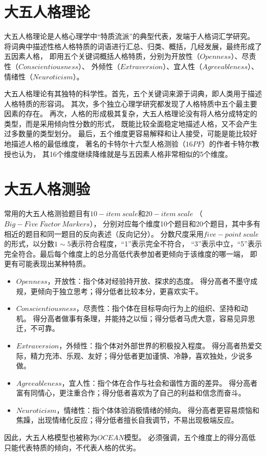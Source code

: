 \documentclass[UTF8]{ctexart}
\begin{document}
\section{大五人格理论}
大五人格理论是人格心理学中“特质流派”的典型代表，发端于人格词汇学研究。
将词典中描述性格人格特质的词语进行汇总、归类、概括，几经发展，最终形成了五因素人格，
即用五个关键词概括人格特质，分别为开放性（$Openness$）、尽责性（$Conscientiousness$）、
外倾性（$Extraversion$）、宜人性（$Agreeableness$）、情绪性（$Neuroticism$）。\par
大五人格理论有其独特的科学性。首先，五个关键词来源于词典，即人类用于描述人格特质的形容词。
其次，多个独立心理学研究都发现了人格特质中五个最主要因素的存在。
再次，人格的形成极其复杂，大五人格理论没有将人格分成特定的类型，而是采用倾向性分数的形式，
既能比较全面稳定地描述人格，又不会产生过多数量的类型划分。
最后，五个维度更容易解释和让人接受，可能是能比较好地描述人格的最低维度，
著名的卡特尔十六型人格测验（$16PF$）的作者卡特尔教授也认为，
其16个维度继续降维就是与五因素人格非常相似的5个维度。
\section{大五人格测验}
常用的大五人格测验题目有$10-item\ scale$和$20-item\ scale$
（\href{https://ipip.ori.org/newBigFive5broadKey.htm}{$Big-Five\ Factor\ Markers$}），
分别对应每个维度10个题目和20个题目，其中多有相近的题目和同一题目的反向表述（反向记分）。
分数尺度采用$five-point\ scale$的形式，以分数$1\sim5$表示符合程度，“1”表示完全不符合，
“3”表示中立，“5”表示完全符合。最后每个维度上的总分高低代表参加者更倾向于该维度的哪一端，
即更有可能表现出某种特质。
\begin{itemize}
  \item $Openness$，开放性：指个体对经验持开放、探求的态度。
        得分高者不墨守成规，更倾向于独立思考；得分低者比较本分，更喜欢实干。
  \item $Conscientiousness$，尽责性：指个体在目标导向行为上的组织、坚持和动机。
        得分高者做事有条理，并能持之以恒；得分低者马虎大意，容易见异思迁，不可靠。
  \item $Extraversion$，外倾性：指个体对外部世界的积极投入程度。
        得分高者热爱交际，精力充沛、乐观、友好；得分低者更加谨慎、冷静，喜欢独处，少说多做。
  \item $Agreeableness$，宜人性：指个体在合作与社会和谐性方面的差异。
        得分高者富有同情心，更注重合作；得分低者喜欢为了自己的利益和信念而奋斗。
  \item $Neuroticism$，情绪性：指个体体验消极情绪的倾向。
        得分高者更容易烦恼和焦躁，出现情绪化反应；得分低者擅长自我调节，不易出现极端反应。
\end{itemize}
\par
因此，大五人格模型也被称为$OCEAN$模型。
必须强调，五个维度上的得分高低只能代表特质的倾向，不代表人格的优劣。
\end{document}
